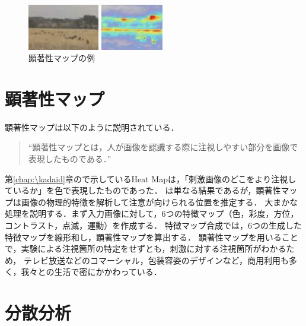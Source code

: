 \begin{figure}
    \centering
    \begin{minipage}{.19\textwidth}
        \centering
        \includegraphics[height=2cm,width=\textwidth]{../../Figures/kenty2.png}
    \end{minipage}
    \begin{minipage}{.19\textwidth}
        \centering
        \includegraphics[height=2cm,width=\textwidth]{../../Figures/kenty1.png}
    \end{minipage}
    \caption{顕著性マップの例\cite{動画像コンテンツにおける注視点マップと顕著性マップとの関係性に関する考察}}
    \vspace{-1.5cm}
\end{figure}
\section{顕著性マップ}
顕著性マップは以下のように説明されている．
\begin{quote}
    ``顕著性マップとは，人が画像を認識する際に注視しやすい部分を画像で表現したものである．''\hfill\cite{顕著性マップを用いた画質評価法}
\end{quote}
第\ref{chap:\kadaid}章ので示しているHeat Mapは，「刺激画像のどこをより注視しているか」を色で表現したものであった．
は単なる結果であるが，顕著性マップは画像の物理的特徴を解析して注意が向けられる位置を推定する．
大まかな処理を説明する．まず入力画像に対して，6つの特徴マップ（色，彩度，方位，コントラスト，点滅，運動）を作成する．
特徴マップ合成では，6つの生成した特徴マップを線形和し，顕著性マップを算出する．
顕著性マップを用いることで，実験による注視箇所の特定をせずとも，刺激に対する注視箇所がわかるため，
テレビ放送などのコマーシャル，包装容姿のデザインなど，商用利用も多く，我々との生活で密にかかわっている．\\
\hfill\cite{動画像コンテンツにおける注視点マップと顕著性マップとの関係性に関する考察}
\section{分散分析}